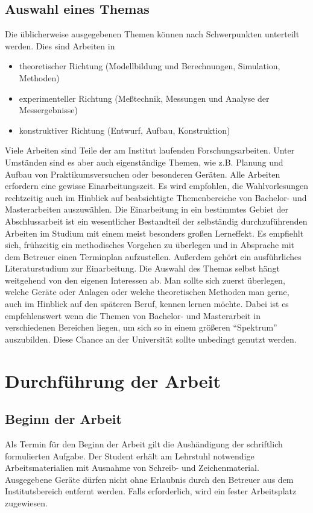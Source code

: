 \section {Auswahl eines Themas}
Die üblicherweise ausgegebenen Themen können nach Schwerpunkten
unterteilt werden. Dies sind Arbeiten in
\begin{itemize}
	\item theoretischer Richtung (Modellbildung und Berechnungen, Simulation, Methoden)
	\item experimenteller Richtung (Meßtechnik, Messungen und Analyse der Messergebnisse)
	\item konstruktiver Richtung (Entwurf, Aufbau, Konstruktion)
\end{itemize}


Viele Arbeiten sind Teile der am Institut laufenden Forschungsarbeiten. Unter Umständen sind es
aber auch eigenständige Themen, wie z.B. Planung und Aufbau von Praktikumsversuchen oder besonderen
Geräten. Alle Arbeiten erfordern eine gewisse Einarbeitungszeit. Es wird empfohlen, die
Wahlvorlesungen rechtzeitig auch im Hinblick auf beabsichtigte Themenbereiche von Bachelor- und Masterarbeiten auszuwählen. Die Einarbeitung in ein bestimmtes 
Gebiet der Abschlussarbeit ist ein wesentlicher Bestandteil der selbständig durchzuführenden Arbeiten im Studium mit einem
meist besonders großen Lerneffekt. Es empfiehlt sich, frühzeitig ein methodisches Vorgehen zu
überlegen und in Absprache mit dem Betreuer einen Terminplan aufzustellen. Außerdem gehört ein
ausführliches Literaturstudium zur Einarbeitung. Die Auswahl des Themas selbst hängt weitgehend von den 
eigenen Interessen ab. Man sollte sich zuerst überlegen, welche Geräte oder Anlagen oder
welche theoretischen Methoden man gerne, auch im Hinblick auf den späteren Beruf, kennen lernen möchte. Dabei ist es empfehlenswert wenn die Themen von Bachelor- und Masterarbeit in verschiedenen Bereichen liegen,
um sich so in einem größeren "`Spektrum"' auszubilden. Diese Chance an der Universität sollte unbedingt genutzt werden.

\chapter{Durchführung der Arbeit}

\section{Beginn der Arbeit}
Als Termin für den Beginn der Arbeit gilt die Aushändigung der schriftlich formulierten Aufgabe.
Der Student erhält am Lehrstuhl notwendige Arbeitsmaterialien mit Ausnahme von Schreib- und
Zeichenmaterial. Ausgegebene Geräte dürfen nicht ohne Erlaubnis durch den Betreuer aus dem
Institutsbereich entfernt werden. Falls erforderlich, wird ein fester Arbeitsplatz zugewiesen. 



